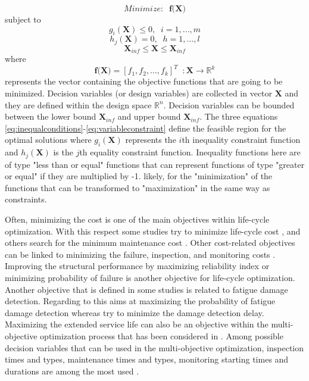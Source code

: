 \begin{equation}
Minimize: \;\; \textbf{f(X)}
\label{eq:objective}
\end{equation}
subject to
\begin{equation}
g_i(\textbf{X})\leq 0, \;\; i=1,...,m
\label{eq:inequalconditions}
\end{equation}
\begin{equation}
h_j(\textbf{X})= 0, \;\; h=1,...,l
\label{eq:equalconditions}
\end{equation}
\begin{equation}
\textbf{X}_{inf} \leq \textbf{X} \leq \textbf{X}_{inf}
\label{eq:variableconstraint}
\end{equation}
where
\begin{equation}
\textbf{f(X)} = [f_1, f_2, ..., f_k]^T \;\; :\textbf{X} \rightarrow \mathbb{R}^k
\label{eq:objectivevector}
\end{equation}
represents the vector containing the objective functions that are going to be minimized. Decision variables (or design variables) are collected in vector $\textbf{X}$ and they are defined within the 
design space $\mathbb{R}^n$. Decision variables can be bounded between the lower bound $\textbf{X}_{inf}$ and upper bound $\textbf{X}_{inf}$. The three equations \ref{eq:inequalconditions}-\ref{eq:variableconstraint}
define the feasible region for the optimal solutions where $g_i(\textbf{X})$ represents the $i$th inequality constraint function and $h_j(\textbf{X})$ is the $j$th equality constraint function. Inequality
functions here are of type "less than or equal" functions that can represent functions of type "greater or equal" if they are multiplied by -1. likely, for the "minimization" of the functions that can be 
transformed to "maximization" in the same way as constraints. 

Often, minimizing the cost is one of the main objectives within life-cycle optimization. With this respect some studies try to minimize life-cycle cost \cite{Lukic2001}, and others search for the minimum 
maintenance cost \citep{ORCESI2010627}. Other cost-related objectives can be linked to minimizing the failure, inspection, and monitoring costs \citep{SOLIMAN2013996, ORCESI201126}. Improving the structural
performance by maximizing reliability index \citep{Kim2018} or minimizing probability of failure \citep{KIM2018356} is another objective for life-cycle optimization. Another objective that is defined in some 
studies is related to fatigue damage detection. Regarding to this \citet{SOLIMAN2013996} aims at maximizing the probability of fatigue damage detection whereas \citet{KIM2011} try to minimize the damage 
detection delay. Maximizing the extended service life can also be an objective within the multi-objective optimization process that has been considered in \citep{KIM2018356, SOLIMAN201691}. Among possible 
decision variables that can be used in the multi-objective optimization, inspection times and types, maintenance times and types, monitoring starting times and durations are among the most used 
\citep{SOLIMAN201691, KIM2018356, ORCESI201126}. 

